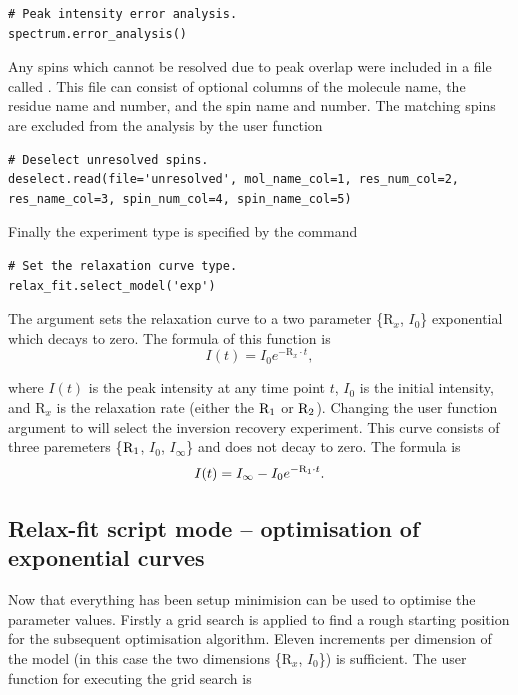\begin{lstlisting}[firstnumber=53]
# Peak intensity error analysis.
spectrum.error_analysis()
\end{lstlisting}

Any spins which cannot be resolved due to peak overlap were included in a file called .  This file can consist of optional columns of the molecule name, the residue name and number, and the spin name and number.  The matching spins are excluded from the analysis by the user function

\begin{lstlisting}[firstnumber=56]
# Deselect unresolved spins.
deselect.read(file='unresolved', mol_name_col=1, res_num_col=2, res_name_col=3, spin_num_col=4, spin_name_col=5)
\end{lstlisting}

Finally the experiment type is specified by the command

\begin{lstlisting}[firstnumber=59]
# Set the relaxation curve type.
relax_fit.select_model('exp')
\end{lstlisting}

The argument  sets the relaxation curve to a two parameter \{$\mathrm{R}_x$, $I_0$\} exponential which decays to zero.  The formula of this function is
\begin{equation}
 I(t) = I_0 e^{-\mathrm{R}_x \cdot t},
\end{equation}

\noindent where $I(t)$ is the peak intensity at any time point $t$, $I_0$ is the initial intensity, and $\mathrm{R}_x$ is the relaxation rate (either the $\mathrm{R}_1$ or $\mathrm{R}_2$).  Changing the user function argument to  will select the inversion recovery experiment.  This curve consists of three paremeters \{$\mathrm{R}_1$, $I_0$, $I_{\infty}$\} and does not decay to zero.  The formula is
\begin{equation}
 I(t) = I_{\infty} - I_0 e^{-\mathrm{R}_1 \cdot t}.
\end{equation}




\subsection{Relax-fit script mode -- optimisation of exponential curves}

Now that everything has been setup minimision can be used to optimise the parameter values.  Firstly a grid search is applied to find a rough starting position for the subsequent optimisation algorithm.  Eleven increments per dimension of the model (in this case the two dimensions \{$\mathrm{R}_x$, $I_0$\}) is sufficient.  The user function for executing the grid search is

